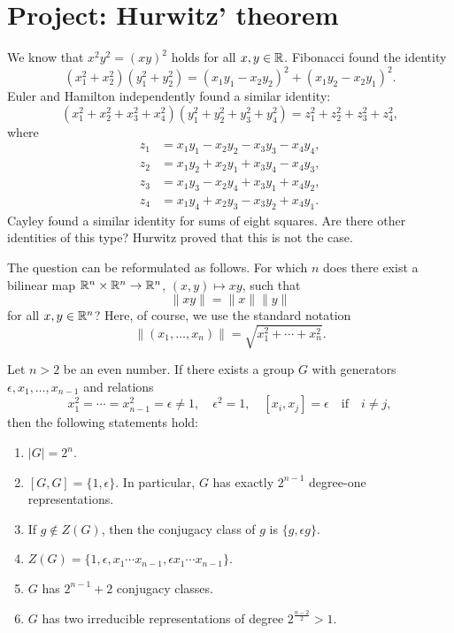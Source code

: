 \section{Project: Hurwitz' theorem}

We know that $x^2y^2=(xy)^2$ holds for all $x,y\in\mathbb{R}$. Fibonacci
found the identity
\begin{equation}
\label{eq:2squares}
	(x_1^2+x_2^2)(y_1^2+y_2^2)=(x_1y_1-x_2y_2)^2+(x_1y_2-x_2y_1)^2.
\end{equation}
Euler and Hamilton independently found 
a similar identity:
\[
	(x_1^2+x_2^2+x_3^2+x_4^2)(y_1^2+y_2^2+y_3^2+y_4^2)=z_1^2+z_2^2+z_3^2+z_4^2,
\]
where
\begin{equation}
\label{eq:Hamilton}
\begin{aligned}
	 z_1&=x_1y_1-x_2y_2-x_3y_3-x_4y_4,\\
	 z_2&=x_1y_2+x_2y_1+x_3y_4-x_4y_3,\\
	 z_3&=x_1y_3-x_2y_4+x_3y_1+x_4y_2,\\ 
	 z_4&=x_1y_4+x_2y_3-x_3y_2+x_4y_1.
\end{aligned}
\end{equation}
Cayley found a similar identity for sums of eight squares. 
Are there other identities of this type? Hurwitz
proved that this is not the case. 

The question can be reformulated as follows. For which $n$ does there 
exist a bilinear map $\mathbb{R}^n\times\mathbb{R}^n\to\mathbb{R}^n$, 
$(x,y)\mapsto xy$, such that
\[
\|xy\|=\|x\|\|y\|
\]
for all $x,y\in\mathbb{R}^n$? Here, of course, we use the 
standard notation
\[
\|(x_1,\dots,x_n)\|=\sqrt{x_1^2+\cdots+x_n^2}.
\]

 \begin{lemma}
 \label{lem:hurwitz_group}
 	Let $n>2$ be an even number. If 
 	there exists a group $G$ with generators
 	$\epsilon,x_1,\dots,x_{n-1}$ and relations 
 	\[
 		x_1^2=\cdots=x_{n-1}^2=\epsilon\ne1,\quad
 		\epsilon^2=1,\quad
 		[x_i,x_j]=\epsilon\quad\text{if}\quad i\ne j,
 	\]
 	then the following statements hold:
 	\begin{enumerate}
 		\item $|G|=2^n$.
 		\item $[G,G]=\{1,\epsilon\}$. In particular, $G$ 
 		    has exactly $2^{n-1}$ degree-one representations. 
 		\item If $g\not\in Z(G)$, then the conjugacy class of $g$ is $\{g,\epsilon g\}$.
 		\item $Z(G)=\{1,\epsilon,x_1\cdots x_{n-1},\epsilon x_1\cdots x_{n-1}\}$. 
 		\item $G$ has $2^{n-1}+2$ conjugacy classes.
 		\item $G$ has two irreducible representations of degree $2^{\frac{n-2}{2}}>1$. 
 	\end{enumerate}
 \end{lemma}

